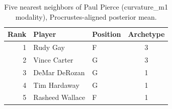 \begin{table}[htbp]
  \centering\small
  \begin{tabular}{rllc}
    \toprule
    Rank & Player & Position & Archetype \\
    \midrule
    1 & Rudy Gay & F & 3 \\
    2 & Vince Carter & G & 3 \\
    3 & DeMar DeRozan & G & 1 \\
    4 & Tim Hardaway & G & 1 \\
    5 & Rasheed Wallace & F & 1 \\
    \bottomrule
  \end{tabular}
  \caption{Five nearest neighbors of Paul Pierce (curvature_m1 modality), Procrustes-aligned posterior mean.}
  \label{tab:Paul_Pierce_neighbors_curvature_m1}
\end{table}

